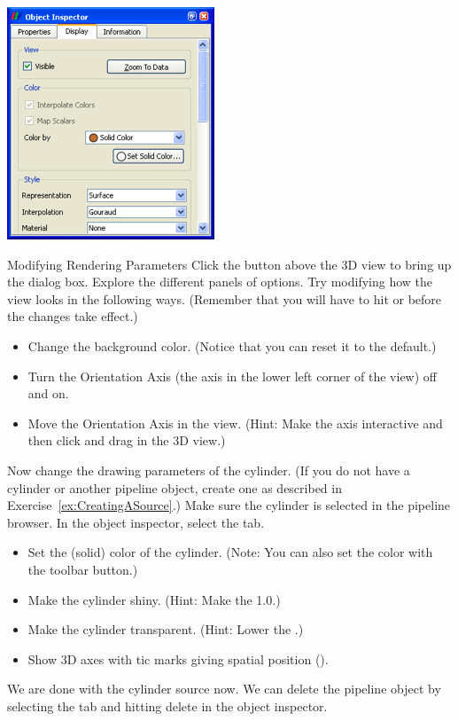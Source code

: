 \begin{inlinefig}
  \includegraphics[width=0.53\scw]{images/DisplayTab}
\end{inlinefig}

\begin{exercise}{Modifying Rendering Parameters}
  \label{ex:ModifyingRenderingParameters}%
  Click the  button above the 3D view to bring up the
   dialog box.  Explore the different panels of
  options.  Try modifying how the view looks in the following ways.
  (Remember that you will have to hit  or  before the
  changes take effect.)

  \begin{itemize}
  \item Change the background color.  (Notice that you can reset it to the
    default.)
  \item Turn the Orientation Axis (the axis in the lower left corner of the
    view) off and on.
  \item Move the Orientation Axis in the view.  (Hint: Make the axis
    interactive and then click and drag in the 3D view.)
  \end{itemize}

  Now change the drawing parameters of the cylinder.  (If you do not have a
  cylinder or another pipeline object, create one as described in
  Exercise~\ref{ex:CreatingASource}.)  Make sure the cylinder is selected
  in the pipeline browser.  In the object inspector, select the
   tab.

  \begin{itemize}
  \item Set the (solid) color of the cylinder.  (Note: You can also set the
    color with the  toolbar button.)
  \item Make the cylinder shiny.  (Hint: Make the 
    1.0.)
  \item Make the cylinder transparent.  (Hint: Lower the .)
  \item Show 3D axes with tic marks giving spatial position ().
  \end{itemize}

  We are done with the cylinder source now.  We can delete the pipeline
  object by selecting the  tab and hitting delete \delete
  in the object inspector.
\end{exercise}


